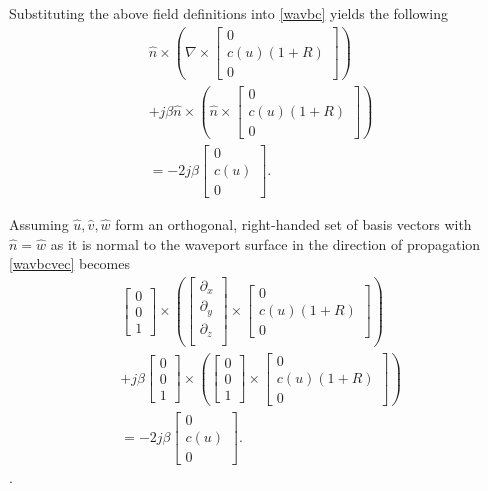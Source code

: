 Substituting the above field definitions into \ref*{wavbc} yields the following
\begin{multline}
    \hat{n} \times \left(\nabla \times \begin{bmatrix}
        0 \\
        c(u)(1+R)\\
        0
    \end{bmatrix}\right) \\ +j\beta\hat{n}\times\left(\hat{n} \times \begin{bmatrix}
        0 \\
        c(u)(1+R)\\
        0
    \end{bmatrix}\right) \\ =-2j\beta\begin{bmatrix}
        0 \\
        c(u)\\
        0
    \end{bmatrix}.
    \label{wavbcvec}
\end{multline}

Assuming $\hat{u},\hat{v},\hat{w}$ form an orthogonal, right-handed set of basis vectors with $\hat{n}=\hat{w}$ as it is normal to the waveport surface in the direction of propagation \ref*{wavbcvec} becomes
\begin{multline}
    \begin{bmatrix}
        0 \\ 0 \\ 1
    \end{bmatrix} \times \left(
        \begin{bmatrix}
            \partial_x \\ 
            \partial_y \\
            \partial_z \\ 
        \end{bmatrix} \times 
    \begin{bmatrix}
        0 \\
        c(u)(1+R)\\
        0
    \end{bmatrix}\right) \\ +j\beta 
    \begin{bmatrix}
        0 \\ 0 \\ 1
    \end{bmatrix} \times \left(
        \begin{bmatrix}
            0 \\ 0 \\ 1
        \end{bmatrix} \times 
    \begin{bmatrix}
        0 \\
        c(u)(1+R)\\
        0
    \end{bmatrix}\right) \\ =-2j\beta
    \begin{bmatrix}
        0 \\
        c(u)\\
        0
    \end{bmatrix}.
\end{multline}.

